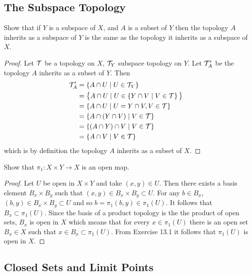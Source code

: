 \subsection{The Subspace Topology}
\begin{ex}{16.1}
    Show that if $Y$ is a subspace of $X$, and $A$ is a subset of $Y$ then the topology $A$ inherits as a subspace of $Y$ is the same as the topology it inherits as a subspace of $X$.
\end{ex}
\begin{proof}
    Let $\mathcal{T}$ be a topology on $X$, $\mathcal{T}_Y$ subspace topology on $Y$. Let $\mathcal{T}_A'$ be the topology $A$ inherits as a subset of $Y$.
    Then
    \begin{align*}
        \mathcal{T}_A'&=\left\{A\cap U\mid U\in\mathcal{T}_Y\right\}\\
        &=\big\{A\cap U\mid U\in\left\{Y\cap V\mid V\in \mathcal{T}\right\} \big\}\\
        &=\left\{A\cap U\mid U= Y\cap V, V\in\mathcal{T}\right\}\\
        &=\left\{A\cap\left(Y\cap V\right)\mid V\in\mathcal{T}\right\}\\
        &=\left\{\left(A\cap Y\right)\cap V\mid V\in\mathcal{T}\right\}\\
        &=\left\{A\cap V\mid V\in\mathcal{T}\right\}    
    \end{align*}
    which is by definition the topology $A$ inherits as a subset of $X$.
\end{proof}

\begin{ex}{16.3}
    
\end{ex}

\begin{ex}{16.4}
    Show that $\pi_1:X\times Y\to X$ is an open map.
\end{ex}
\begin{proof}
    Let $U$ be open in $X\times Y$ and take $(x,y)\in U$. Then there exists a basis element $B_x\times B_y$ such that $(x,y)\in B_x\times B_y\subset U$.
    For any $b\in B_x$, $(b,y)\in B_x\times B_y\subset U$ and so $b=\pi_1(b,y)\in \pi_1(U)$. It follows that $B_x\subset\pi_1(U)$.
    Since the basis of a product topology is the the product of open sets, $B_x$ is open in $X$ which means that for every $x\in\pi_1(U)$ there is an open set $B_x\in X$ such that $x\in B_x\subset \pi_1(U)$.
    From Exercise 13.1 it follows that $\pi_1(U)$ is open in $X$.    
\end{proof}

\subsection{Closed Sets and Limit Points}


